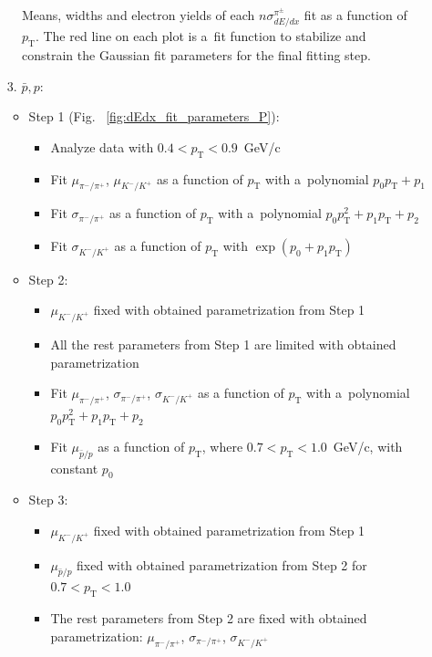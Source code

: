 \begin{figure}[h!]
\begin{subfigure}{.32\textwidth}
	\end{subfigure}
	\begin{minipage}{.64\textwidth}
		\caption{Means, widths and electron yields of each $n\sigma^{\pi^\pm}_{dE/dx}$ fit as a function of $p_\textrm{T}$.  The red line on each plot is a~fit function to stabilize and constrain the Gaussian fit parameters for the final fitting step.}
		\label{fig:dEdx_fit_parametersPi}
	\end{minipage}
	
\end{figure}
\begin{enumerate}
	\item[3.] $\bar{p},p$:
	\begin{itemize}
		\item Step 1 (Fig. ~\ref{fig:dEdx_fit_parameters_P}):
		\begin{itemize}
			\renewcommand\labelitemi{--}
			\item Analyze data with $0.4 < p_\textrm{T} < 0.9$~GeV/c
			\item Fit  $\mu_{\pi^-/\pi^+}$, $\mu_{K^-/K^+}$   as a function of $p_\textrm{T}$ with a~polynomial  $p_0p_\textrm{T}+p_1$ 
			\item Fit  $\sigma_{\pi^-/\pi^+}$  as a function of $p_\textrm{T}$ with a~polynomial $p_0p_\textrm{T}^2+p_1p_\textrm{T}+p_2$ 
			\item Fit $\sigma_{K^-/K^+}$ as a function of $p_\textrm{T}$ with $\exp\left(p_0+p_1p_\textrm{T}\right)$
		\end{itemize}
		\item Step 2:
		\begin{itemize}
			\renewcommand\labelitemi{--}
			\item $\mu_{K^-/K^+}$ fixed with obtained parametrization from Step 1
			\item All the rest parameters from Step 1 are limited with obtained parametrization
			\item Fit  $\mu_{\pi^-/\pi^+}$, $\sigma_{\pi^-/\pi^+}$, $\sigma_{K^-/K^+}$  as a function of $p_\textrm{T}$ with a~polynomial $p_0p_\textrm{T}^2+p_1p_\textrm{T}+p_2$ 
			\item Fit  $\mu_{\bar{p}/p}$  as a function of $p_\textrm{T}$, where $0.7<p_\textrm{T}<1.0$~GeV/c, with constant $p_0$ 
			
		\end{itemize}
		\item Step 3:
		\begin{itemize}
			\renewcommand\labelitemi{--}
			\item  $\mu_{K^-/K^+}$ fixed with obtained parametrization from Step 1
			\item $\mu_{\bar{p}/p}$  fixed with obtained parametrization from Step 2 for $0.7<p_\textrm{T}<1.0$
			\item  The rest parameters from Step 2 are fixed with obtained parametrization: $\mu_{\pi^-/\pi^+}$, $\sigma_{\pi^-/\pi^+}$, $\sigma_{K^-/K^+}$
		\end{itemize}		
	\end{itemize}		
\end{enumerate} 
